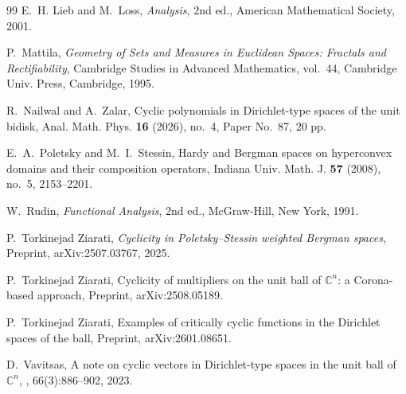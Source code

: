 \documentclass[a4paper,12pt]{amsart}
\theoremstyle{definition}
\begin{document}
\begin{thebibliography}{99}
E.~H. Lieb and M.~Loss,
\emph{Analysis},
2nd ed.,
American Mathematical Society, 2001.

P.~Mattila,
\emph{Geometry of Sets and Measures in Euclidean Spaces:
Fractals and Rectifiability},
Cambridge Studies in Advanced Mathematics, vol.~44,
Cambridge Univ. Press, Cambridge, 1995.

R.~Nailwal and A.~Zalar,
Cyclic polynomials in Dirichlet-type spaces of the unit bidisk,
Anal. Math. Phys. \textbf{16} (2026), no.~4, Paper No.~87, 20 pp.



E.~A.~Poletsky and M.~I.~Stessin,
Hardy and Bergman spaces on hyperconvex domains and their composition operators,
Indiana Univ. Math. J. \textbf{57} (2008), no.~5, 2153--2201.

W.~Rudin,
\emph{Functional Analysis},
2nd ed., McGraw-Hill, New York, 1991.


P.~Torkinejad Ziarati,
\emph{Cyclicity in Poletsky--Stessin weighted Bergman spaces},
Preprint, arXiv:2507.03767, 2025.

P.~Torkinejad Ziarati,
\newblock Cyclicity of multipliers on the unit ball of $\mathbb{C}^n$: a {Corona}-based approach,
\newblock Preprint, arXiv:2508.05189.

P.~Torkinejad Ziarati,
\newblock Examples of critically cyclic functions in the {Dirichlet} spaces of the ball,
\newblock Preprint, arXiv:2601.08651.

D.~Vavitsas,
\newblock A note on cyclic vectors in Dirichlet-type spaces in the unit ball of $\mathbb{C}^n$,
, 66(3):886–902, 2023.


\end{thebibliography}
\end{document}
